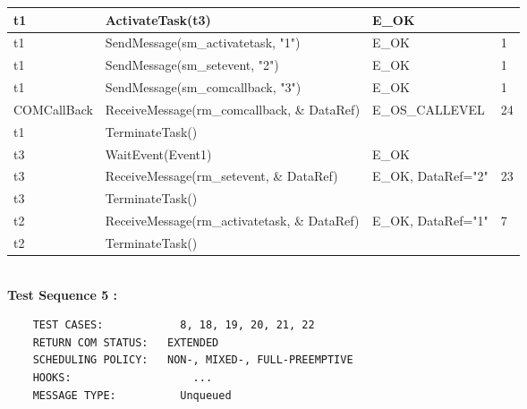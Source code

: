 \documentclass[10pt]{article}
\newlength{\Li}\settowidth{\Li}{Running}
\newlength{\Lii}\setlength{\Lii}{7cm}
\newlength{\Liiii}\setlength{\Liiii}{0.9cm}
\newlength{\Liii}\setlength{\Liii}{\textwidth} \addtolength{\Liii}{-\Li} \addtolength{\Liii}{-\Lii} \addtolength{\Liii}{-\Liiii}
\begin{document}
	\begin{supertabular}{|p{\Li}|p{\Lii}|p{\Liii}|p{\Liiii}|} \hline 
	t1	& ActivateTask(t3)									& E\_OK				& \\ \hline
	t1	& SendMessage(sm\_activatetask, "1")					& E\_OK				& 1 \\ \hline
	t1	& SendMessage(sm\_setevent, "2")						& E\_OK				& 1 \\ \hline
	t1	& SendMessage(sm\_comcallback, "3")					& E\_OK				& 1 \\ \hline
	COMCallBack	& ReceiveMessage(rm\_comcallback, \& DataRef)	& E\_OS\_CALLEVEL	& 24 \\ \hline
	t1	& TerminateTask()									&					&\\ \hline 
	t3	& WaitEvent(Event1)									& E\_OK				& \\ \hline
	t3	& ReceiveMessage(rm\_setevent, \& DataRef)				& E\_OK, DataRef="2"	& 23 \\ \hline
	t3 	& TerminateTask() 									&					& \\ \hline 
	t2	& ReceiveMessage(rm\_activatetask, \& DataRef)			& E\_OK, DataRef="1"	& 7 \\ \hline
	t2 	& TerminateTask() 									&					& \\ \hline 
	\end{supertabular}\\

	

\settowidth{\Li}{Running}
\setlength{\Lii}{8cm}	
\setlength{\Liii}{\textwidth} \addtolength{\Liii}{-\Li} \addtolength{\Liii}{-\Lii} \addtolength{\Liii}{-\Liiii}
	\textbf{Test Sequence 5 :}
	\begin{lstlisting}
	TEST CASES:		       8, 18, 19, 20, 21, 22
	RETURN COM STATUS:	 EXTENDED
	SCHEDULING POLICY:   NON-, MIXED-, FULL-PREEMPTIVE
	HOOKS:			         ...
	MESSAGE TYPE:	       Unqueued
	\end{lstlisting}
	
	
\end{document}
